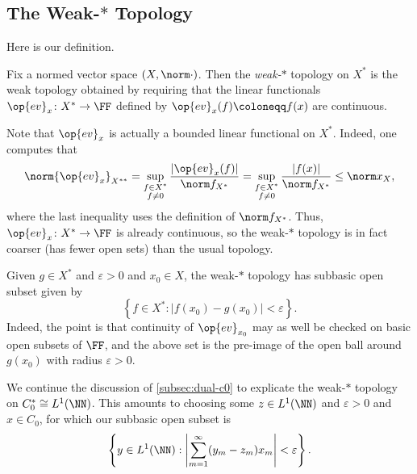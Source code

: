 \documentclass[../notes.tex]{subfiles}
\begin{document}
\subsection{The Weak-\texorpdfstring{$*$}{*} Topology}
Here is our definition.
\begin{definition}
	Fix a normed vector space $(X,\norm\cdot)$. Then the \textit{weak-$*$} topology on $X^*$ is the weak topology obtained by requiring that the linear functionals $\op{ev}_x\colon X^*\to\FF$ defined by $\op{ev}_x(f)\coloneqq f(x)$ are continuous.
\end{definition}
\begin{remark} \label{rem:ev-x-is-bounded}
	Note that $\op{ev}_x$ is actually a bounded linear functional on $X^*$. Indeed, one computes that
	\[\norm{\op{ev}_x}_{X^{**}}=\sup_{\substack{f\in X^*\\f\ne0}}\frac{\left|\op{ev}_x(f)\right|}{\norm f_{X^*}}=\sup_{\substack{f\in X^*\\f\ne0}}\frac{\left|f(x)\right|}{\norm f_{X^*}}\le\norm x_X,\]
	where the last inequality uses the definition of $\norm f_{X^*}$. Thus, $\op{ev}_x\colon X^*\to\FF$ is already continuous, so the weak-$*$ topology is in fact coarser (has fewer open sets) than the usual topology.
\end{remark}
\begin{example}
	Given $g\in X^*$ and $\varepsilon>0$ and $x_0\in X$, the weak-$*$ topology has subbasic open subset given by
	\[\left\{f\in X^*:\left|f(x_0)-g(x_0)\right|<\varepsilon\right\}.\]
	Indeed, the point is that continuity of $\op{ev}_{x_0}$ may as well be checked on basic open subsets of $\FF$, and the above set is the pre-image of the open ball around $g(x_0)$ with radius $\varepsilon>0$.
\end{example}
\begin{example}
	We continue the discussion of \cref{subsec:dual-c0} to explicate the weak-$*$ topology on $C_0^*\cong L^1(\NN)$. This amounts to choosing some $z\in L^1(\NN)$ and $\varepsilon>0$ and $x\in C_0$, for which our subbasic open subset is
	\[\left\{y\in L^1(\NN):\left|\sum_{m=1}^\infty(y_m-z_m)x_m\right|<\varepsilon\right\}.\]
\end{example}
\end{document}
